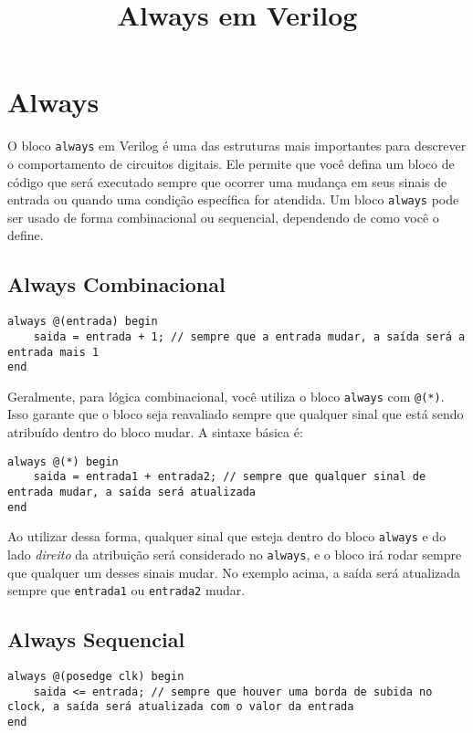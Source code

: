 \documentclass{article}
\title{Always em Verilog}
\date{}
\begin{document}
\maketitle

\section*{Always}

O bloco \texttt{always} em Verilog é uma das estruturas mais importantes para descrever o comportamento de circuitos digitais. Ele permite que você defina um bloco de código que será executado sempre que ocorrer uma mudança em seus sinais de entrada ou quando uma condição específica for atendida. Um bloco \texttt{always} pode ser usado de forma combinacional ou sequencial, dependendo de como você o define.

\subsection*{Always Combinacional}

\begin{lstlisting}
always @(entrada) begin
    saida = entrada + 1; // sempre que a entrada mudar, a saída será a entrada mais 1
end
\end{lstlisting}

Geralmente, para lógica combinacional, você utiliza o bloco \texttt{always} com \texttt{@(*)}. Isso garante que o bloco seja reavaliado sempre que qualquer sinal que está sendo atribuído dentro do bloco mudar. A sintaxe básica é:

\begin{lstlisting}
always @(*) begin
    saida = entrada1 + entrada2; // sempre que qualquer sinal de entrada mudar, a saída será atualizada
end
\end{lstlisting}

Ao utilizar dessa forma, qualquer sinal que esteja dentro do bloco \texttt{always} e do lado \emph{direito} da atribuição será considerado no \texttt{always}, e o bloco irá rodar sempre que qualquer um desses sinais mudar. No exemplo acima, a saída será atualizada sempre que \texttt{entrada1} ou \texttt{entrada2} mudar.

\subsection*{Always Sequencial}

\begin{lstlisting}
always @(posedge clk) begin
    saida <= entrada; // sempre que houver uma borda de subida no clock, a saída será atualizada com o valor da entrada
end
\end{lstlisting}
\end{document}
